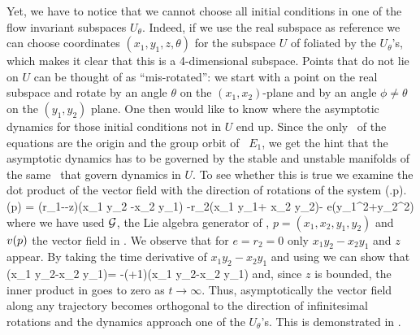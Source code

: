 Yet, we have to notice that we cannot choose all initial conditions
in one of the flow invariant subspaces $U_\theta$. Indeed, if we use the real subspace
as reference we can choose coordinates $(x_1,y_1,z,\theta)$ for the subspace $U$ of 
foliated by the $U_\theta$'s, which makes it clear that this is a 4-dimensional subspace.
Points that do not lie on $U$ can be thought of as ``mis-rotated'': we start with a point on
the real subspace and rotate by an angle $\theta$ on the $(x_1,x_2)$-plane and by an
angle $\phi\neq\theta$ on the $(y_1,y_2)$ plane. One then would like to know where the asymptotic dynamics
for those initial conditions not in $U$ end up. Since the only \eqv\ of the equations are the origin
and the group orbit of \eqv\ $E_1$, we get the hint that the asymptotic dynamics has to be governed
by the stable and unstable manifolds of the same \eqva\ that govern dynamics in $U$.
To see whether this is true we examine the dot product of the vector field with the direction of
rotations of the system
\beq
	(\Lg.p).\vf(p) = \left(r_1-\sigma-z\right)\left(x_1 y_2 -x_2 y_1\right) -r_2\left(x_1 y_1+ x_2 y_2\right)- e\left(y_1^2+y_2^2\right)
	\label{eq:CLe0ip}
\eeq
where we have used $\mathcal{G}$, the Lie algebra generator of , $p=(x_1,x_2,y_1,y_2)$ and $v(p)$ the vector field in .
We observe that for $e=r_2=0$ only $x_1 y_2-x_2 y_1$ and $z$ appear. By taking the time derivative of $x_1 y_2-x_2 y_1$ and using 
we can show that
\beq
	\left(x_1 y_2-x_2 y_1\right)= -(\sigma+1)\left(x_1 y_2-x_2 y_1\right)
\eeq
and, since $z$ is bounded, the inner product in  goes to zero as $t\rightarrow\infty$. Thus, asymptotically the vector
field along any trajectory becomes orthogonal to the direction of infinitesimal rotations and the dynamics approach one of the $U_\theta$'s.
This is demonstrated in .

